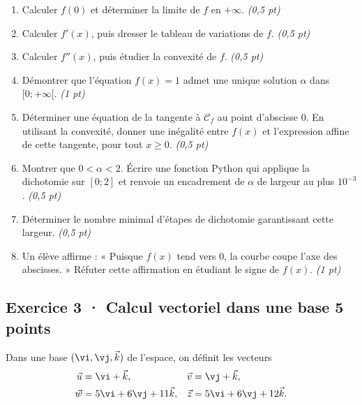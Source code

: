 \begin{enumerate}

\item Calculer $f(0)$ et déterminer la limite de $f$ en $+\infty$. \hfill\textit{(0,5 pt)}

\item Calculer $f' (x)$, puis dresser le tableau de variations de $f$. \hfill\textit{(0,5 pt)}

\item Calculer $f'' (x)$, puis étudier la convexité de $f$. \hfill\textit{(0,5 pt)}

\item Démontrer que l'équation $f(x)=1$ admet une unique solution $\alpha$ dans $[0;+\infty[$. \hfill\textit{(1 pt)}

\item Déterminer une équation de la tangente à $\mathcal C_f$ au point d'abscisse $0$. En utilisant la convexité, donner une inégalité entre $f(x)$ et l'expression affine de cette tangente, pour tout $x\ge0$. \hfill\textit{(0,5 pt)}

\item Montrer que $0<\alpha<2$. Écrire une fonction Python qui applique la dichotomie sur $[0;2]$ et renvoie un encadrement de $\alpha$ de largeur au plus $10^{-3}$. \hfill\textit{(0,5 pt)}

\item Déterminer le nombre minimal d'étapes de dichotomie garantissant cette largeur. \hfill\textit{(0,5 pt)}

\item Un élève affirme : « Puisque $f(x)$ tend vers $0$, la courbe coupe l'axe des abscisses. » Réfuter cette affirmation en étudiant le signe de $f(x)$. \hfill\textit{(1 pt)}

\end{enumerate}

\clearpage{}\par

\subsection*{Exercice 3 · Calcul vectoriel dans une base \hfill 5 points}Dans une base $(\vi,\vj,\vec k)$ de l'espace, on définit les vecteurs
\[\begin{aligned}\vec u&=\vi+\vec k,&\vec v&=\vj+\vec k,\\
\vec w&=5\vi+6\vj+11\vec k,&\vec z&=5\vi+6\vj+12\vec k.\end{aligned}\]

